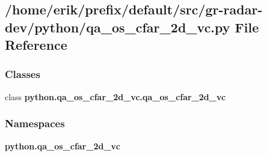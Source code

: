 \subsection{/home/erik/prefix/default/src/gr-\/radar-\/dev/python/qa\+\_\+os\+\_\+cfar\+\_\+2d\+\_\+vc.py File Reference}
\label{qa__os__cfar__2d__vc_8py}
\subsubsection*{Classes}
\begin{DoxyCompactItemize}
\item 
class {\bf python.\+qa\+\_\+os\+\_\+cfar\+\_\+2d\+\_\+vc.\+qa\+\_\+os\+\_\+cfar\+\_\+2d\+\_\+vc}
\end{DoxyCompactItemize}
\subsubsection*{Namespaces}
\begin{DoxyCompactItemize}
\item 
 {\bf python.\+qa\+\_\+os\+\_\+cfar\+\_\+2d\+\_\+vc}
\end{DoxyCompactItemize}
